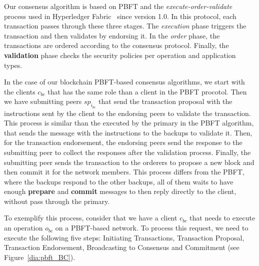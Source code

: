 \documentclass[conference]{IEEEtran}
\begin{document}
Our consensus algorithm is based on PBFT and the \textit{execute-order-validate} process used in Hyperledger Fabric~\cite{androulaki2018hyperledger} since version 1.0. In this protocol, each transaction passes through these three stages. The \textit{execution} phase triggers the transaction and then validates by endorsing it. In the \textit{order} phase, the transactions are ordered according to the consensus protocol. Finally, the \textbf{validation} phase checks the security policies per operation and application types.

In the case of our blockchain PBFT-based consensus algorithms, we start with the clients $c_{bc}$ that has the same role than a client in the PBFT procotol. Then we have submitting peers $sp_{i_{bc}}$ that send the transaction proposal with the instructions sent by the client to the endorsing peers to validate the transaction. This process is similar than the executed by the primary in the PBFT algorithm, that sends the message with the instructions to the backups to validate it. Then, for the transaction endorsement, the endorsing peers send the response to the submitting peer to collect the responses after the validation process. Finally, the submitting peer sends the transaction to the orderers to propose a new block and then commit it for the network members. This process differs from the PBFT, where the backups respond to the other backups, all of them waits to have enough \textbf{prepare} and \textbf{commit} messages to then reply directly to the client, without pass through the primary. 

To exemplify this process, consider that we have a client $c_{bc}$ that needs to execute an operation $o_{bc}$ on a PBFT-based network. To process this request, we need to execute the following five steps: Initiating Transactions, Transaction Proposal, Transaction Endorsement, Broadcasting to Consensus and Commitment (see Figure~\ref{dia:pbft_BC}).
\end{document}
